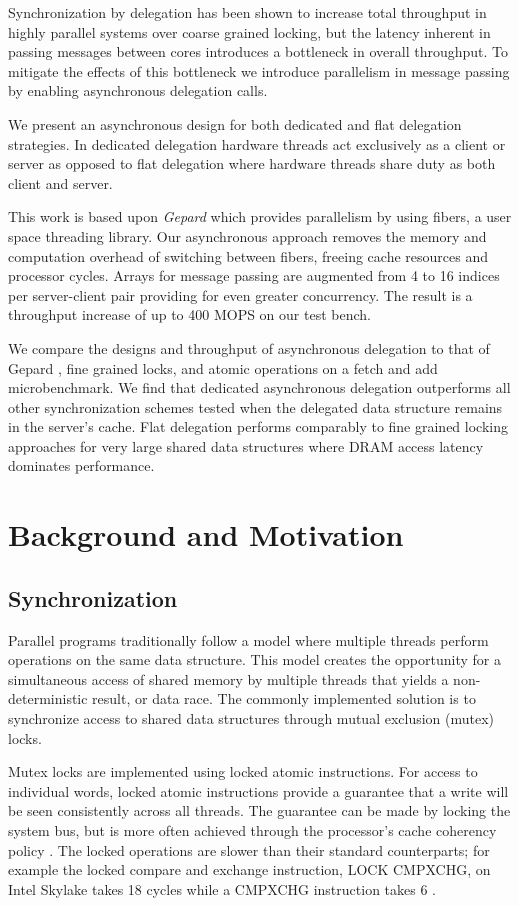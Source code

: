 \documentclass{uicthesi}
\begin{document}
\summary
Synchronization by delegation has been shown to increase total throughput in highly parallel systems over coarse grained locking, \cite{ffwd} but the latency inherent in passing messages between cores introduces a bottleneck in overall throughput. To mitigate the effects of this bottleneck we introduce parallelism in message passing by enabling asynchronous delegation calls. 

We present an asynchronous design for both dedicated and flat delegation strategies. In dedicated delegation hardware threads act exclusively as a client or server as opposed to flat delegation where hardware threads share duty as both client and server. 

This work is based upon \textit{Gepard} which provides parallelism by using fibers, a user space threading library. Our asynchronous approach removes the memory and computation overhead of switching between fibers, freeing cache resources and processor cycles. Arrays for message passing are augmented from 4 to 16 indices per server-client pair providing for even greater concurrency. The result is a throughput increase of up to 400 MOPS on our test bench.  

We compare the designs and throughput of asynchronous delegation to that of Gepard \cite{gepard}, fine grained locks, and atomic operations on a fetch and add microbenchmark. We find that dedicated asynchronous delegation outperforms all other synchronization schemes tested when the delegated data structure remains in the server's cache. Flat delegation performs comparably to fine grained locking approaches for very large shared data structures where DRAM access latency dominates performance. 

\chapter{Background and Motivation}
\section{Synchronization}
Parallel programs traditionally follow a model where multiple threads perform operations on the same data structure. This model creates the opportunity for a simultaneous access of shared memory by multiple threads that yields a non-deterministic result, or data race. The commonly implemented solution is to synchronize access to shared data structures through mutual exclusion (mutex) locks. 

Mutex locks are implemented using locked atomic instructions. For access to individual words, locked atomic instructions provide a guarantee that a write will be seen consistently across all threads. The guarantee can be made by locking the system bus, but is more often achieved through the processor's cache coherency policy \cite{IntelDevelopersManual}. The locked operations are slower than their standard counterparts; for example the locked compare and exchange instruction, LOCK CMPXCHG, on Intel Skylake takes 18 cycles while a CMPXCHG  instruction takes 6 \cite{agner}. 
\end{document}

